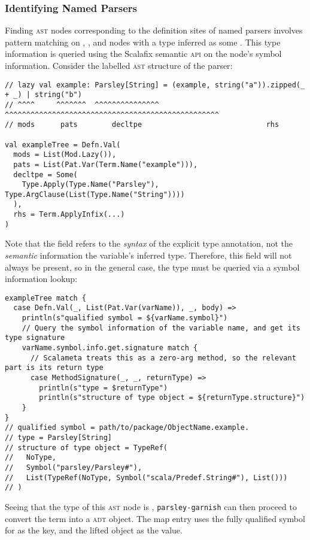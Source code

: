 \documentclass[../../main.tex]{subfiles}
\begin{document}
\subsubsection{Identifying Named Parsers}
Finding \textsc{ast} nodes corresponding to the definition sites of named parsers involves pattern matching on , , and  nodes with a type inferred as some .
This type information is queried using the Scalafix semantic \textsc{api} on the node's symbol information.
Consider the labelled \textsc{ast} structure of the  parser:
\begin{verbatim}
// lazy val example: Parsley[String] = (example, string("a")).zipped(_ + _) | string("b")
// ^^^^     ^^^^^^^  ^^^^^^^^^^^^^^^   ^^^^^^^^^^^^^^^^^^^^^^^^^^^^^^^^^^^^^^^^^^^^^^^^^^
// mods      pats        decltpe                             rhs

val exampleTree = Defn.Val(
  mods = List(Mod.Lazy()),
  pats = List(Pat.Var(Term.Name("example"))),
  decltpe = Some(
    Type.Apply(Type.Name("Parsley"), Type.ArgClause(List(Type.Name("String"))))
  ),
  rhs = Term.ApplyInfix(...)
)
\end{verbatim}
%
Note that the \scala{decltpe} field refers to the \emph{syntax} of the explicit type annotation, not the \emph{semantic} information the variable's inferred type.
Therefore, this field will not always be present, so in the general case, the type must be queried via a symbol information lookup:
\begin{verbatim}
exampleTree match {
  case Defn.Val(_, List(Pat.Var(varName)), _, body) =>
    println(s"qualified symbol = ${varName.symbol}")
    // Query the symbol information of the variable name, and get its type signature
    varName.symbol.info.get.signature match {
      // Scalameta treats this as a zero-arg method, so the relevant part is its return type
      case MethodSignature(_, _, returnType) =>
        println(s"type = $returnType")
        println(s"structure of type object = ${returnType.structure}")
    }
}
// qualified symbol = path/to/package/ObjectName.example.
// type = Parsley[String]
// structure of type object = TypeRef(
//   NoType,
//   Symbol("parsley/Parsley#"),
//   List(TypeRef(NoType, Symbol("scala/Predef.String#"), List()))
// )
\end{verbatim}
Seeing that the type of this \textsc{ast} node is , \texttt{parsley-garnish} can then proceed to convert the  term into a  \textsc{adt} object.
The map entry uses the fully qualified symbol for \scala{example} as the key, and the lifted \scala{Parser} object as the value.
\end{document}
